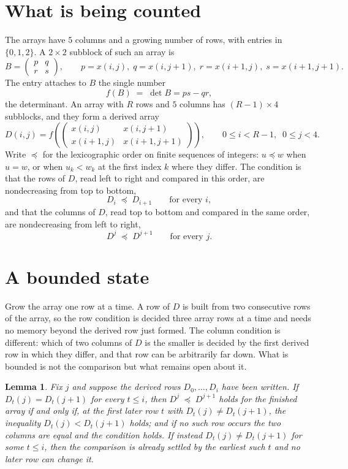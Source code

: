 \documentclass[11pt,a4paper]{article}
\theoremstyle{plain}
\newtheorem{lemma}[theorem]{Lemma}
\theoremstyle{definition}
\begin{document}
\section{What is being counted}

The arrays have $5$ columns and a growing number of rows, with entries in $\{0,1,2\}$. A
$2\times2$ subblock of such an array is
\[
B=\begin{pmatrix} p & q \\ r & s \end{pmatrix},
\qquad p=x(i,j),\; q=x(i,j+1),\; r=x(i+1,j),\; s=x(i+1,j+1).
\]
The entry attaches to $B$ the single number
\[
f(B)\;=\;\det B=ps-qr,
\]
the determinant. An array with $R$ rows and $5$ columns has $(R-1)\times4$ subblocks, and they
form a derived array
\[
D(i,j)=f\!\left(\begin{pmatrix} x(i,j) & x(i,j+1) \\ x(i+1,j) & x(i+1,j+1)\end{pmatrix}
\right),\qquad 0\le i<R-1,\;\; 0\le j<4 .
\]
Write $\preceq$ for the lexicographic order on finite sequences of integers: $u\preceq w$ when
$u=w$, or when $u_k<w_k$ at the first index $k$ where they differ. The condition is that the
rows of $D$, read left to right and compared in this order, are nondecreasing from top to bottom,
\[
D_{i}\;\preceq\;D_{i+1}\qquad\text{for every } i,
\]
and that the columns of $D$, read top to bottom and compared in the same order, are nondecreasing
from left to right,
\[
D^{j}\;\preceq\;D^{j+1}\qquad\text{for every } j .
\]

\section{A bounded state}

Grow the array one row at a time. A row of $D$ is built from two consecutive rows of the array,
so the row condition is decided three array rows at a time and needs no memory beyond the
derived row just formed. The column condition is different: which of two columns of $D$ is the
smaller is decided by the first derived row in which they differ, and that row can be
arbitrarily far down. What is bounded is not the comparison but what remains open about it.

\begin{lemma}\label{lem:bits}
Fix $j$ and suppose the derived rows $D_0,\dots,D_i$ have been written. If $D_t(j)=D_t(j+1)$ for
every $t\le i$, then $D^{j}\;\preceq\;D^{j+1}$ holds for the finished array if and only if,
at the first later row $t$ with $D_t(j)\neq D_t(j+1)$, the inequality $D_t(j)<D_t(j+1)$
holds; and if no such row occurs the two columns are equal and the condition holds. If instead
$D_t(j)\neq D_t(j+1)$ for some $t\le i$, then the comparison is already settled by the earliest
such $t$ and no later row can change it.
\end{lemma}
\end{document}
